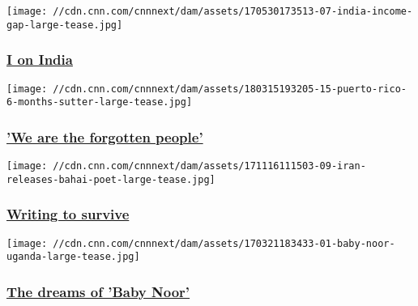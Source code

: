 \href{http://www.cnn.com/interactive/2017/10/world/i-on-india-income-gap/}{}

\texttt{[image: //cdn.cnn.com/cnnnext/dam/assets/170530173513-07-india-income-gap-large-tease.jpg]}

\hypertarget{i-on-india}{%
\subsubsection{\texorpdfstring{\href{http://www.cnn.com/interactive/2017/10/world/i-on-india-income-gap/}{I
on India}}{I on India}}\label{i-on-india}}

\href{/2018/03/15/politics/puerto-rico-six-month-deaths-sutter-invs/index.html}{}

\texttt{[image: //cdn.cnn.com/cnnnext/dam/assets/180315193205-15-puerto-rico-6-months-sutter-large-tease.jpg]}

\hypertarget{we-are-the-forgotten-people}{%
\subsubsection{\texorpdfstring{\href{/2018/03/15/politics/puerto-rico-six-month-deaths-sutter-invs/index.html}{'We
are the forgotten
people'}}{'We are the forgotten people'}}\label{we-are-the-forgotten-people}}

\href{/2017/11/16/world/iran-prison-poet/index.html}{}

\texttt{[image: //cdn.cnn.com/cnnnext/dam/assets/171116111503-09-iran-releases-bahai-poet-large-tease.jpg]}

\hypertarget{writing-to-survive}{%
\subsubsection{\texorpdfstring{\href{/2017/11/16/world/iran-prison-poet/index.html}{Writing
to survive}}{Writing to survive}}\label{writing-to-survive}}

\href{http://www.cnn.com/interactive/2017/04/health/dreams-of-baby-noor/}{}

\texttt{[image: //cdn.cnn.com/cnnnext/dam/assets/170321183433-01-baby-noor-uganda-large-tease.jpg]}

\hypertarget{the-dreams-of-baby-noor}{%
\subsubsection{\texorpdfstring{\href{http://www.cnn.com/interactive/2017/04/health/dreams-of-baby-noor/}{The
dreams of 'Baby
Noor'}}{The dreams of 'Baby Noor'}}\label{the-dreams-of-baby-noor}}


